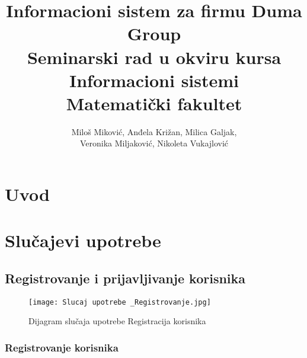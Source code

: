 \documentclass[a4paper]{article}
\begin{document}
\title{Informacioni sistem za firmu Duma Group\\ \small{Seminarski rad u okviru kursa\\Informacioni sistemi\\ Matematički fakultet}}

\author{Miloš Miković, Anđela Križan, Milica Galjak, \\ Veronika Miljaković, Nikoleta Vukajlović}


\maketitle

\abstract{
}

\tableofcontents

\newpage

\section{Uvod}

\section{Slučajevi upotrebe}


\subsection{Registrovanje i prijavljivanje korisnika}

\begin{figure}[htp]
    \centering
    \texttt{[image: Slucaj upotrebe \_Registrovanje.jpg]}
    \caption{Dijagram slučaja upotrebe Registracija korisnika}
    \label{fig:Registracija}
\end{figure}

\subsubsection{Registrovanje korisnika}
\end{document}
